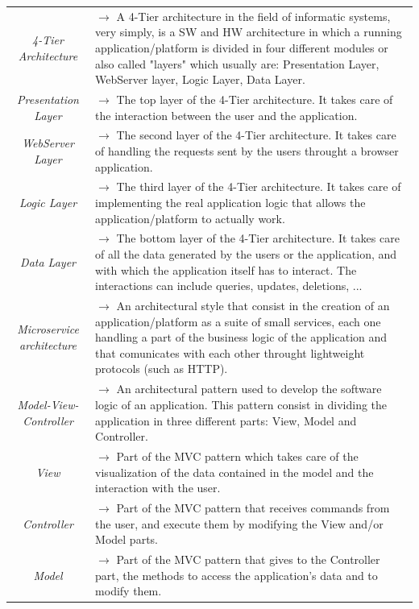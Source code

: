 \documentclass{article}
\begin{document}
{\begin{xltabular}{\textwidth}{ >{\raggedright\arraybackslash}c >{\raggedright\arraybackslash}X }
    \textit{4-Tier Architecture} & $\rightarrow$ A 4-Tier architecture in the field of informatic systems, very simply,
    is a SW and HW architecture in which a running application/platform is divided in four 
    different modules or also called "layers" which usually are: Presentation Layer, WebServer 
    layer, Logic Layer, Data Layer. \\
    \textit{Presentation Layer} & $\rightarrow$ The top layer of the 4-Tier architecture. It 
    takes care of the interaction between the user and the application.\\
    \textit{WebServer Layer} & $\rightarrow$ The second layer of the 4-Tier architecture. It 
    takes care of handling the requests sent by the users throught a browser application. \\
    \textit{Logic Layer} & $\rightarrow$ The third layer of the 4-Tier architecture. It takes 
    care of implementing the real application logic that allows the application/platform to 
    actually work. \\
    \textit{Data Layer} & $\rightarrow$ The bottom layer of the 4-Tier architecture. It takes 
    care of all the data generated by the users or the application, and with which the 
    application itself has to interact. The interactions can include queries, updates, deletions, ... \\
    \textit{Microservice architecture} & $\rightarrow$ An architectural style that consist in the 
    creation of an application/platform as a suite of small services, each one handling a part 
    of the business logic of the application and that comunicates with each other throught 
    lightweight protocols (such as HTTP). \\
    \textit{Model-View-Controller} & $\rightarrow$ An architectural pattern used to develop the
    software logic of an application. This pattern consist in dividing the application in three
    different parts: View, Model and Controller. \\
    \textit{View} & $\rightarrow$ Part of the MVC pattern which takes care of the visualization of the
    data contained in the model and the interaction with the user. \\
    \textit{Controller} & $\rightarrow$ Part of the MVC pattern that receives commands from the user, and execute them
    by modifying the View and/or Model parts. \\
    \textit{Model} & $\rightarrow$ Part of the MVC pattern that gives to the Controller part, the
    methods to access the application's data and to modify them. \\

\end{xltabular}}
\end{document}

